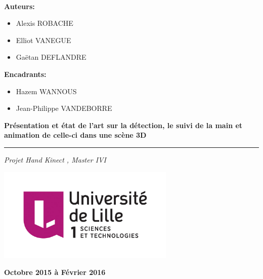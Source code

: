\documentclass{pjsivi}
\begin{document}

\ 
\vspace{1cm}

\begin{multicols}{2}  

    \textbf{\large Auteurs:}
    \begin{itemize}
      \item Alexis ROBACHE
      \item Elliot VANEGUE
      \item Gaëtan DEFLANDRE
    \end{itemize}
    
    \textbf{\large Encadrants:}\\
    \begin{itemize}
      \item Hazem WANNOUS
      \item Jean-Philippe VANDEBORRE 
    \end{itemize}

\end{multicols}

\vspace{4cm}

 \begin{flushright}
  \begin{spacing}{1.6}
    \textbf{
      {\LARGE Présentation et état de l'art sur la détection, 
      le suivi de la main et animation de celle-ci dans une scène 3D}
    }
  \end{spacing}
  \hrule
  \vspace{0.2cm}
  \textit{
    {\Large\textcolor{mygray}{Projet \og Hand Kinect \fg, Master IVI}}
  }
\end{flushright}

\vspace{3.5cm}

\begin{center}
  \includegraphics[height=4.5cm]{images/logoLILLE1.jpg}
  \vspace{3.5cm}


  {\large\textbf{Octobre 2015 à Février 2016}}
\end{center}
\end{document}
